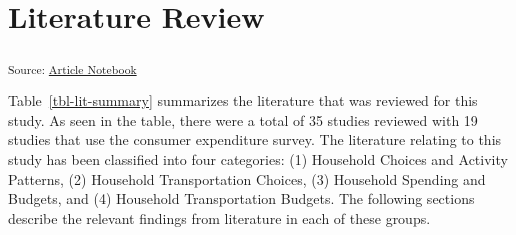 \documentclass[
]{agujournal2019}
\begin{document}
\section{Literature Review}\label{literature-review}

\textsubscript{Source:
\href{https://KamrynMansfield.github.io/transpo_budget_ces/index.qmd.html}{Article
Notebook}}

Table~\ref{tbl-lit-summary} summarizes the literature that was reviewed
for this study. As seen in the table, there were a total of 35 studies
reviewed with 19 studies that use the consumer expenditure survey. The
literature relating to this study has been classified into four
categories: (1) Household Choices and Activity Patterns, (2) Household
Transportation Choices, (3) Household Spending and Budgets, and (4)
Household Transportation Budgets. The following sections describe the
relevant findings from literature in each of these groups.
\end{document}
